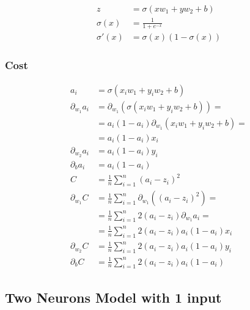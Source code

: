 \documentclass{article}
\begin{document}
\begin{center}
\end{center}
\begin{align}
  z &= \sigma(xw_1 + yw_2 + b) \\
  \sigma(x) &= \frac{1}{1 + e^{-x}} \\
  \sigma'(x) &= \sigma(x)(1 - \sigma(x))
\end{align}

\subsubsection{Cost}

\def\pd[#1]{\partial_{#1}}
\def\avgsum[#1,#2]{\frac{1}{#2}\sum_{#1=1}^{#2}}
\begin{align}
  a_i &= \sigma(x_iw_1 + y_iw_2 + b) \\
  \pd[w_1]a_i
      &= \pd[w_1](\sigma(x_iw_1 + y_iw_2 + b)) = \\
      &= a_i(1 - a_i)\pd[w_1](x_iw_1 + y_iw_2 + b) = \\
      &= a_i(1 - a_i)x_i \\
  \pd[w_2]a_i &= a_i(1 - a_i)y_i \\
  \pd[b]a_i &= a_i(1 - a_i) \\
  C &= \avgsum[i, n](a_i - z_i)^2 \\
  \pd[w_1] C
      &= \avgsum[i, n]\pd[w_1]\left((a_i - z_i)^2\right) = \\
      &= \avgsum[i, n]2(a_i - z_i)\pd[w_1]a_i = \\
      &= \avgsum[i, n]2(a_i - z_i)a_i(1 - a_i)x_i \\
  \pd[w_2] C &= \avgsum[i, n]2(a_i - z_i)a_i(1 - a_i)y_i \\
  \pd[b] C &= \avgsum[i, n]2(a_i - z_i)a_i(1 - a_i)
\end{align}

\subsection{Two Neurons Model with 1 input}

\begin{center}
\end{center}
\end{document}
